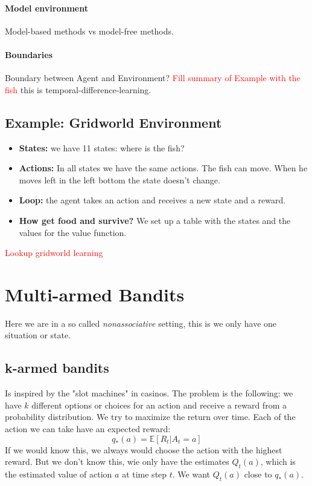 \documentclass[10pt,a4paper]{article}
\begin{document}
\paragraph{Model environment}
Model-based methods vs model-free methods.

\paragraph{Boundaries}
Boundary between Agent and Environment?  \textcolor{red}{Fill summary of Example with the fish} this is temporal-difference-learning.

\subsection{Example: Gridworld Environment}
\begin{itemize}
\item \textbf{States:} we have 11 states: where is the fish?
\item \textbf{Actions:} In all states we have the same actions. The fish can move. When he moves left in the left bottom the state doesn't change.
\item \textbf{Loop:} the agent takes an action and receives a new state and a reward.
\item \textbf{How get food and survive?} We set up a table with the states and the values for the value function.
\end{itemize}

\textcolor{red}{Lookup gridworld learning}
\pagebreak
\section{Multi-armed Bandits}
Here we are in a so called \textit{nonassociative} setting, this is we only have one situation or state.

\subsection{k-armed bandits}
Is inspired by the "slot machines" in casinos. 
The problem is the following: we have $k$ different options or choices for an action and receive a reward from a probability distribution. We try to maximize the return over time. Each of the action we can take have an expected reward:
\[ q_{*}(a) = \mathbb{E}[R_t | A_t = a ] \]
If we would know this, we always would choose the action with the highest reward. But we don't know this, wie only have the estimates $Q_t(a)$, which is the estimated value of action $a$ at time step $t$. We want $Q_t(a)$ close to $q_{*}(a)$.
\end{document}
